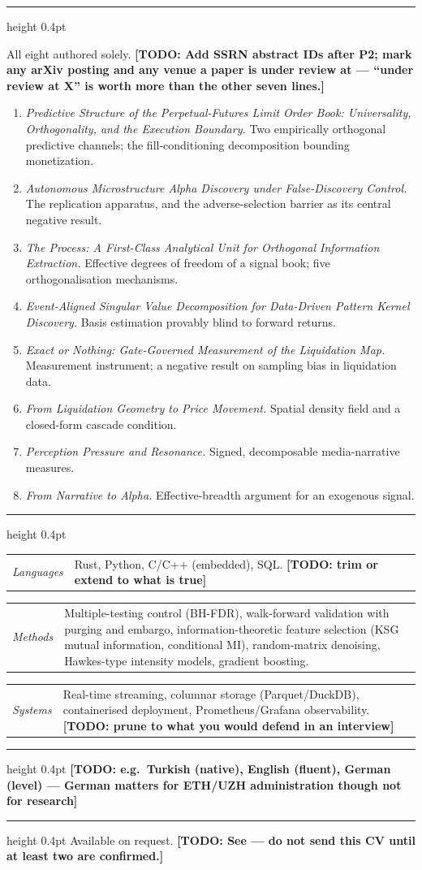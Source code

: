 \documentclass[11pt,a4paper]{article}
\makeatletter
\newcommand{\TODO}[1]{\textbf{[TODO: #1]}}
\newcommand{\code}[1]{\texttt{\detokenize{#1}}}
\newcommand{\cvsec}[1]{%
  \vspace{7pt}{\normalsize\bfseries #1}\par\vspace{1pt}\hrule height 0.4pt\vspace{4pt}}
\newcommand{\entry}[2]{%
  \vspace{2pt}\noindent\begin{tabular}{@{}p{0.19\textwidth}@{}p{0.79\textwidth}@{}}
  \textit{#1} & #2 \end{tabular}\par}
\makeatother
\begin{document}
\cvsec{Working papers}

All eight authored solely. \TODO{Add SSRN abstract IDs after P2; mark any arXiv posting and any
venue a paper is under review at --- ``under review at X'' is worth more than the other seven lines.}

\begin{enumerate}\itemsep1pt
  \item \textit{Predictive Structure of the Perpetual-Futures Limit Order Book: Universality,
        Orthogonality, and the Execution Boundary.} Two empirically orthogonal predictive channels;
        the fill-conditioning decomposition bounding monetization.
  \item \textit{Autonomous Microstructure Alpha Discovery under False-Discovery Control.}
        The replication apparatus, and the adverse-selection barrier as its central negative result.
  \item \textit{The Process: A First-Class Analytical Unit for Orthogonal Information Extraction.}
        Effective degrees of freedom of a signal book; five orthogonalisation mechanisms.
  \item \textit{Event-Aligned Singular Value Decomposition for Data-Driven Pattern Kernel Discovery.}
        Basis estimation provably blind to forward returns.
  \item \textit{Exact or Nothing: Gate-Governed Measurement of the Liquidation Map.}
        Measurement instrument; a negative result on sampling bias in liquidation data.
  \item \textit{From Liquidation Geometry to Price Movement.} Spatial density field and a
        closed-form cascade condition.
  \item \textit{Perception Pressure and Resonance.} Signed, decomposable media-narrative measures.
  \item \textit{From Narrative to Alpha.} Effective-breadth argument for an exogenous signal.
\end{enumerate}

\cvsec{Technical}
\entry{Languages}{Rust, Python, C/C++ (embedded), SQL. \TODO{trim or extend to what is true}}
\entry{Methods}{Multiple-testing control (BH-FDR), walk-forward validation with purging and embargo,
  information-theoretic feature selection (KSG mutual information, conditional MI), random-matrix
  denoising, Hawkes-type intensity models, gradient boosting.}
\entry{Systems}{Real-time streaming, columnar storage (Parquet/DuckDB), containerised deployment,
  Prometheus/Grafana observability. \TODO{prune to what you would defend in an interview}}

\cvsec{Languages}
\TODO{e.g.\ Turkish (native), English (fluent), German (level) --- German matters for ETH/UZH
  administration though not for research}

\cvsec{References}
Available on request. \TODO{See \code{referees.md} --- do not send this CV until at least two are
  confirmed.}
\end{document}
